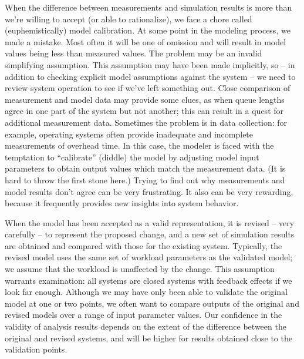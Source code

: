 When the difference between measurements and simulation results is more than
we're willing to accept (or able to rationalize), we face a chore called
(euphemistically) model calibration. At some point in the modeling process, we
made a mistake. Most often it will be one of omission and will result in model
values being less than measured values. The problem may be an invalid
simplifying assumption. This assumption may have been made implicitly, so --
 in addition to checking explicit model assumptions against the system -- we
need to review system operation to see if we've left something out. Close
comparison of measurement and model data may provide some clues, as when queue
lengths agree in one part of the system but not another; this can result in a
quest for additional measurement data. Sometimes the problem is in data
collection: for example, operating systems often provide inadequate and
incomplete measurements of overhead time. In this case, the modeler is faced
with the temptation to ``calibrate'' (diddle) the model by adjusting model
input parameters to obtain output values which match the measurement data. (It
is hard to throw the first stone here.) Trying to find out why measurements and
model results don't agree can be very frustrating. It also can be very
rewarding, because it frequently provides new insights into system behavior.

When the model has been accepted as a valid representation, it is revised --
very carefully -- to represent the proposed change, and a new set of
simulation results are obtained and compared with those for the existing
system. Typically, the revised model uses the same set of workload parameters
as the validated model; we assume that the workload is unaffected by the
change. This assumption warrants examination: all systems are closed systems
with feedback effects if we look far enough. Although we may have only been
able to validate the original model at one or two points, we often want to
compare outputs of the original and revised models over a range of input
parameter values. Our confidence in the validity of analysis results depends
on the extent of the difference between the original and revised systems, and
will be higher for results obtained close to the validation points.

